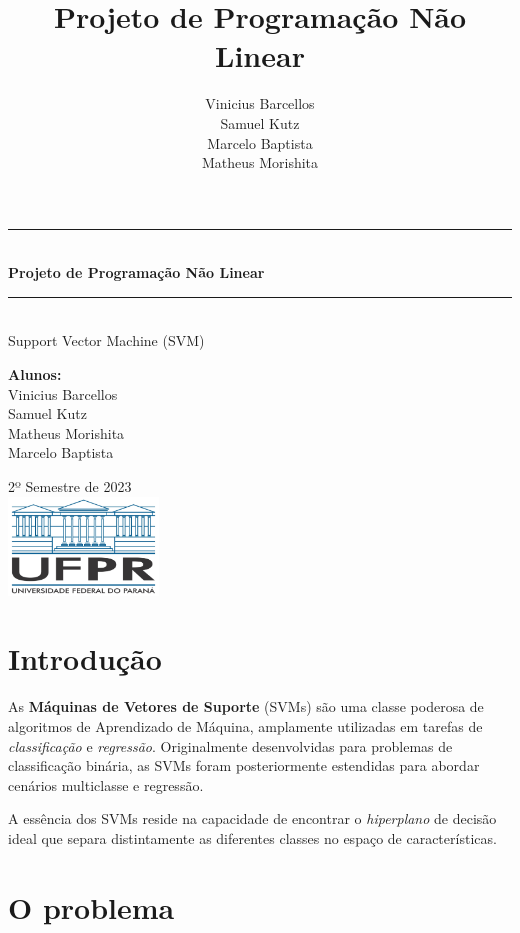 \documentclass{article}
\title{Projeto de Programação Não Linear}
\author{Vinicius Barcellos\\Samuel Kutz \\Marcelo Baptista \\Matheus Morishita}
\date{}
\begin{document}
\newcommand{\HRule}{\rule{\linewidth}{0.5mm}}
\begin{titlepage}
    \begin{center}
        \vspace*{0.5cm}
            
        \Huge
        \HRule\\[0.4cm]
        \textbf{Projeto de Programação Não Linear}
        \HRule\\[0.4cm]

        
        \vspace{0.5cm}
        \LARGE
        Support Vector Machine (SVM)
            
        \vspace{0.8cm}
        \textbf{Alunos:}\\
        Vinicius Barcellos\\Samuel Kutz\\Matheus Morishita\\Marcelo Baptista
            
        \vfill
        2º Semestre de 2023\\ 
        \vfill
        \includegraphics[width=0.3\textwidth]{ufpr_1000.jpg}
            
            
    \end{center}
\end{titlepage}

\section{Introdução}

As \textbf{Máquinas de Vetores de Suporte} (SVMs) são uma classe poderosa de algoritmos de Aprendizado de Máquina, amplamente utilizadas em tarefas de \textit{classificação} e \textit{regressão}. Originalmente desenvolvidas para problemas de classificação binária, as SVMs foram posteriormente estendidas para abordar cenários multiclasse e regressão.

A essência dos SVMs reside na capacidade de encontrar o \textit{hiperplano} de decisão ideal que separa distintamente as diferentes classes no espaço de características.

\section{O problema}
\end{document}
